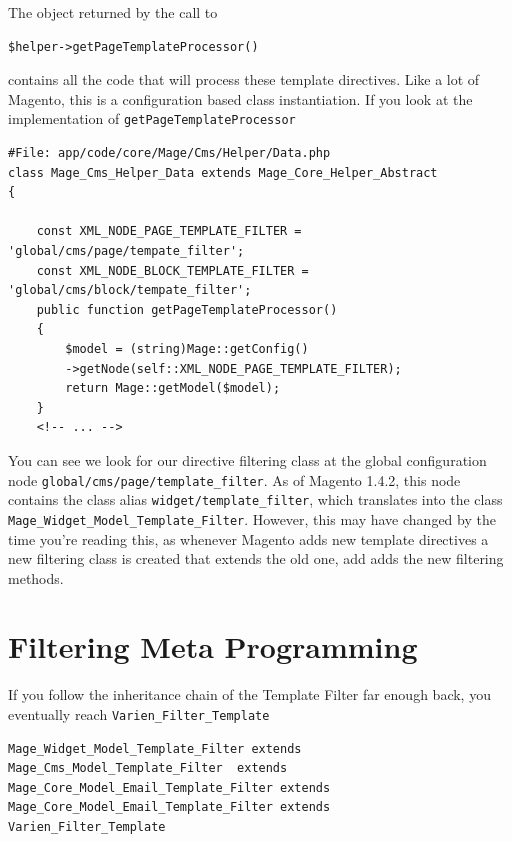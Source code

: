 \documentclass[oneside]{book}
\begin{document}
The object returned by the call to 

\begin{lstlisting}
$helper->getPageTemplateProcessor()

\end{lstlisting}


contains all the code that will process these template directives.  Like a lot of Magento, this is a configuration based class instantiation.  If you look at the implementation of \footnotesize\texttt{getPageTemplateProcessor} \normalsize 

\begin{lstlisting}
#File: app/code/core/Mage/Cms/Helper/Data.php
class Mage_Cms_Helper_Data extends Mage_Core_Helper_Abstract
{

    const XML_NODE_PAGE_TEMPLATE_FILTER = 'global/cms/page/tempate_filter';
    const XML_NODE_BLOCK_TEMPLATE_FILTER = 'global/cms/block/tempate_filter';   
    public function getPageTemplateProcessor()
    {
        $model = (string)Mage::getConfig()
        ->getNode(self::XML_NODE_PAGE_TEMPLATE_FILTER);
        return Mage::getModel($model);
    }   
    <!-- ... -->

\end{lstlisting}


You can see we look for our directive filtering class at the global configuration node \footnotesize\texttt{global/cms/page/template\_filter}\normalsize.  As of Magento 1.4.2, this node contains the class alias \footnotesize\texttt{widget/template\_filter}\normalsize, which translates into the class \footnotesize\texttt{Mage\_Widget\_Model\_Template\_Filter}\normalsize.  However, this may have changed by the time you're reading this, as whenever Magento adds new template directives a new filtering class is created that extends the old one, add adds the new filtering methods.

\section{Filtering Meta Programming}

If you follow the inheritance chain of the Template Filter far enough back, you eventually reach \footnotesize\texttt{Varien\_Filter\_Template} \normalsize 

\begin{lstlisting}
Mage_Widget_Model_Template_Filter extends
Mage_Cms_Model_Template_Filter  extends
Mage_Core_Model_Email_Template_Filter extends
Mage_Core_Model_Email_Template_Filter extends
Varien_Filter_Template

\end{lstlisting}
\end{document}
